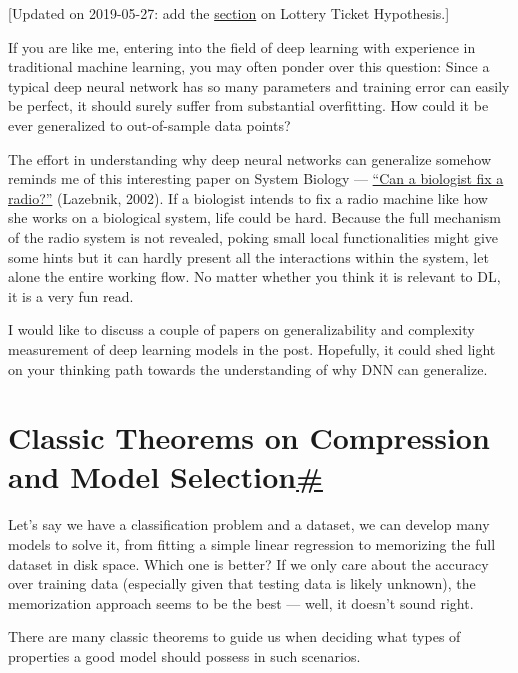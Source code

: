 {{[}Updated on 2019-05-27: add the \hyperref[the-lottery-ticket-hypothesis]{section} on Lottery Ticket Hypothesis.{]}}

If you are like me, entering into the field of deep learning with experience in traditional machine learning, you may often ponder over this question: Since a typical deep neural network has so many parameters and training error can easily be perfect, it should surely suffer from substantial overfitting. How could it be ever generalized to out-of-sample data points?

The effort in understanding why deep neural networks can generalize somehow reminds me of this interesting paper on System Biology --- \href{https://www.cell.com/cancer-cell/pdf/S1535-6108(02)00133-2.pdf}{``Can a biologist fix a radio?''} (Lazebnik, 2002). If a biologist intends to fix a radio machine like how she works on a biological system, life could be hard. Because the full mechanism of the radio system is not revealed, poking small local functionalities might give some hints but it can hardly present all the interactions within the system, let alone the entire working flow. No matter whether you think it is relevant to DL, it is a very fun read.

I would like to discuss a couple of papers on generalizability and complexity measurement of deep learning models in the post. Hopefully, it could shed light on your thinking path towards the understanding of why DNN can generalize.

\section{\texorpdfstring{Classic Theorems on Compression and Model Selection\hyperref[classic-theorems-on-compression-and-model-selection]{\#}}{Classic Theorems on Compression and Model Selection\#}}\label{classic-theorems-on-compression-and-model-selection}

Let's say we have a classification problem and a dataset, we can develop many models to solve it, from fitting a simple linear regression to memorizing the full dataset in disk space. Which one is better? If we only care about the accuracy over training data (especially given that testing data is likely unknown), the memorization approach seems to be the best --- well, it doesn't sound right.

There are many classic theorems to guide us when deciding what types of properties a good model should possess in such scenarios.

